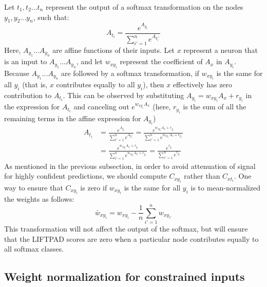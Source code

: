 \documentclass{article}
\begin{document}
Let ${t_1, t_2...t_n}$ represent the output of a softmax transformation on the nodes ${y_1, y_2...y_n}$, such that:
\begin{equation}
A_{t_i} = \frac{e^{A_{y_i}}}{\sum_{i' = 1}^n e^{A_{y_i'}}} 
\end{equation}
Here, $A_{y_1}...A_{y_n}$ are affine functions of their inputs. Let $x$ represent a neuron that is an input to $A_{y_1}...A_{y_n}$, and let $w_{xy_i}$ represent the coefficient of $A_x$ in $A_{y_i}$. Because $A_{y_1}...A_{y_n}$ are followed by a softmax transformation, if $w_{xy_i}$ is the same for all $y_i$ (that is, $x$ contributes equally to all $y_i$), then $x$ effectively has zero contribution to $A_{t_i}$. This can be observed by substituting $A_{y_i} = w_{xy_i}A_x + r_{y_i}$ in the expression for $A_{t_i}$ and canceling out $e^{w_{xy_i}A_x}$ (here, $r_{y_i}$ is the sum of all the remaining terms in the affine expression for $A_{y_i}$)
\begin{equation}
\begin{aligned}
A_{t_i} &= \frac{e^{A_{y_i}}}{\sum_{i' = 1}^n e^{A_{y_i'}}} = \frac{e^{w_{xy_i}A_x + r_{y_i}}}{\sum_{i' = 1}^n e^{w_{xy_{i'}}A_x + r_{y_{i'}}}}\\
           &= \frac{e^{w_{xy_i}A_x + r_{y_i}}}{\sum_{i' = 1}^n e^{w_{xy_i}A_x + r_{y_{i'}}}} = \frac{e^{r_{y_i}}}{\sum_{i' = 1}^n e^{r_{y_{i'}}}} 
\end{aligned}
\end{equation}
As mentioned in the previous subsection, in order to avoid attenuation of signal for highly confident predictions, we should compute $C_{xy_i}$ rather than $C_{xt_i}$. One way to ensure that $C_{xy_i}$ is zero if $w_{xy_i}$ is the same for all $y_i$ is to mean-normalized the weights as follows:
\begin{equation}
\bar{w}_{xy_i} = w_{xy_i} - \frac{1}{n} \sum_{i' = 1}^n w_{xy_{i'}}  
\end{equation} 
This transformation will not affect the output of the softmax, but will ensure that the LIFTPAD scores are zero when a particular node contributes equally to all softmax classes.

\subsection{Weight normalization for constrained inputs}
\end{document}

